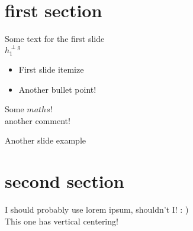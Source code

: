 \documentclass{shard}
\begin{document}
    \titleframe
    \section{first section}
    \begin{frame}
        Some text for the first slide\\
        $h_{1}^{\perp g}$
        \begin{itemize}
            \item[\bdot] First slide itemize
            \item[\bdot] Another bullet point!
        \end{itemize}
        Some $maths!$\\
        another comment!
    \end{frame}
    \begin{frame}
        Another slide example
    \end{frame}
    \section{second section}
    \begin{frame}[thing][0][{}][0][{}][1]
        I should probably use lorem ipsum, shouldn't I! : )\\
        This one has vertical centering!
    \end{frame}
\end{document}
